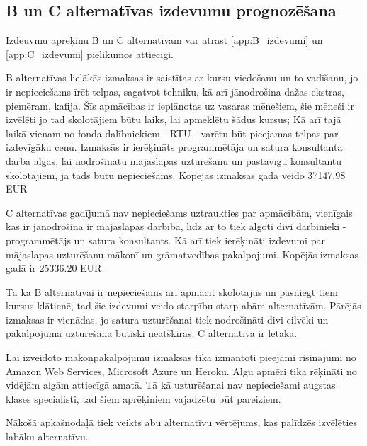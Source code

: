 \subsection{B un C alternatīvas izdevumu prognozēšana}
Izdeuvmu aprēķinu B un C alternatīvām var atrast \ref{app:B_izdevumi} un \ref{app:C_izdevumi} pielikumos attiecīgi.
\par
B alternatīvas lielākās izmaksas ir saistītas ar kursu viedošanu un to vadīšanu, jo ir nepieciešams īrēt telpas,
sagatvot tehniku, kā arī jānodrošina dažas ekstras, piemēram, kafija. Šīs apmācības ir ieplānotas uz vasaras mēnešiem,
šie mēneši ir izvēlēti jo tad skolotājiem būtu laiks, lai apmeklētu šādus kursus; Kā arī tajā laikā vienam no fonda 
dalībniekiem - RTU - varētu būt pieejamas telpas par izdevīgāku cenu. Izmaksās ir ierēķināts programmētāja un satura
konsultanta darba algas, lai nodrošinātu mājaslapas uzturēšanu un pastāvīgu konsultantu skolotājiem, ja tāds būtu
nepieciešams. Kopējās izmaksas gadā veido 37147.98 EUR
\par
C alternatīvas gadījumā nav nepieciešams uztraukties par apmācībām, vienīgais kas ir jānodrošina ir mājaslapas darbība,
līdz ar to tiek algoti divi darbinieki - programmētājs un satura konsultants. Kā arī tiek ierēķināti izdevumi par
mājaslapas uzturēšanu mākonī un grāmatvedības pakalpojumi. Kopējās izmaksas gadā ir 25336.20 EUR.
\par
Tā kā B alternatīvai ir nepieciešams arī apmācīt skolotājus un pasniegt tiem kursus klātienē, tad šie izdevumi veido
starpību starp abām alternatīvām. Pārējās izmaksas ir vienādas, jo satura uzturēšanai tiek nodrošināti divi cilvēki un
pakalpojuma uzturēšana būtiski neatšķiras. C alternatīva ir lētāka.
\par
Lai izveidoto mākoņpakalpojumu izmaksas tika izmantoti pieejami risinājumi no Amazon Web Services, Microsoft Azure un
Heroku. Algu apmēri tika rēķināti no vidējām algām attiecīgā amatā. Tā kā uzturēšanai nav nepieciešami augstas klases
specialisti, tad šiem aprēķiniem vajadzētu būt pareiziem.
\par
Nākošā apkašnodaļā tiek veikts abu alternatīvu vērtējums, kas palīdzēs izvēlēties labāku alternatīvu.
